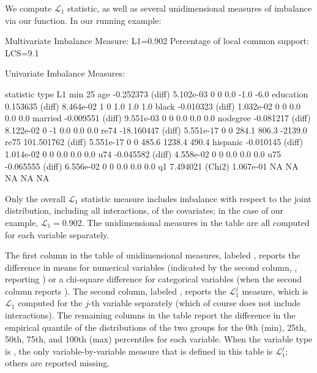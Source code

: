 \documentclass[article]{jss}
\begin{document}
We compute $\mathcal L_1$ statistic, as well as several unidimensional
measures of imbalance via our  function.  In our
running example:
  
\begin{Schunk}
\begin{Soutput}
Multivariate Imbalance Measure: L1=0.902
Percentage of local common support: LCS=9.1%

Univariate Imbalance Measures:

           statistic   type        L1 min 25%
age        -0.252373 (diff) 5.102e-03   0   0   0.0   -1.0    -6.0
education   0.153635 (diff) 8.464e-02   1   0   1.0    1.0     1.0
black      -0.010323 (diff) 1.032e-02   0   0   0.0    0.0     0.0
married    -0.009551 (diff) 9.551e-03   0   0   0.0    0.0     0.0
nodegree   -0.081217 (diff) 8.122e-02   0  -1   0.0    0.0     0.0
re74      -18.160447 (diff) 5.551e-17   0   0 284.1  806.3 -2139.0
re75      101.501762 (diff) 5.551e-17   0   0 485.6 1238.4   490.4
hispanic   -0.010145 (diff) 1.014e-02   0   0   0.0    0.0     0.0
u74        -0.045582 (diff) 4.558e-02   0   0   0.0    0.0     0.0
u75        -0.065555 (diff) 6.556e-02   0   0   0.0    0.0     0.0
q1          7.494021 (Chi2) 1.067e-01  NA  NA    NA     NA      NA
\end{Soutput}
\end{Schunk}
  
Only the overall $\mathcal L_1$ statistic measure includes imbalance
with respect to the joint distribution, including all
interactions, of the covariates; in the case of our example, $\mathcal
L_1=$0.902.  The unidimensional measures in the
table are all computed for each variable separately.

The first column in the table of unidimensional measures, labeled
, reports the difference in means for numerical
variables (indicated by the second column, , reporting
) or a chi-square difference for categorical variables
(when the second column reports ).  The second column,
labeled , reports the $\mathcal L_1^j$ measure, which is
$\mathcal L_1$ computed for the $j$-th variable separately (which of
course does not include interactions).  The remaining columns in the
table report the difference in the empirical quantile of the
distributions of the two groups for the 0th (min), 25th, 50th, 75th,
and 100th (max) percentiles for each variable.  When the variable type
is , the only variable-by-variable measure that is defined
in this table is $\mathcal L_1^j$; others are reported missing.
\end{document}
